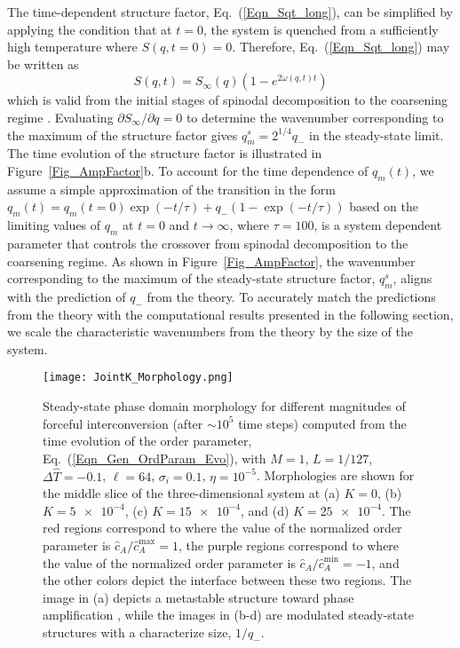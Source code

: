 \documentclass[5p,twocolumn]{elsarticle}
\begin{document}
The time-dependent structure factor, Eq.~(\ref{Eqn_Sqt_long}), can be simplified by applying the condition that at $t=0$, the system is quenched from a sufficiently high temperature where $S(q,t=0)=0$. Therefore, Eq.~(\ref{Eqn_Sqt_long}) may be written as
\begin{equation}\label{Eqn-SCH}
	S(q,t) = S_{\infty}(q)\left(1 - e^{2\omega(q,t)t}\right) 
\end{equation}
which is valid from the initial stages of spinodal decomposition to the coarsening regime \cite{binder_collective_1983,Cahn_Later_1966}. Evaluating $\partial S_\infty/\partial q =0$ to determine the wavenumber corresponding to the maximum of the structure factor gives $q_m^s = 2^{1/4}q_-$ in the steady-state limit. The time evolution of the structure factor is illustrated in Figure~\ref{Fig_AmpFactor}b. To account for the time dependence of $q_m(t)$, we assume a simple approximation of the transition in the form $q_m(t)=q_m(t=0)\exp(-t/\tau)+q_-(1-\exp(-t/\tau))$ based on the limiting values of $q_m$ at $t=0$ and $t\to\infty$, where $\tau = 100$, is a system dependent parameter that controls the crossover from spinodal decomposition to the coarsening regime. As shown in Figure~\ref{Fig_AmpFactor}, the wavenumber corresponding to the maximum of the steady-state structure factor, $q_m^s$, aligns with the prediction of $q_-$ from the theory. To accurately match the predictions from the theory with the computational results presented in the following section, we scale the characteristic wavenumbers from the theory by the size of the system.

\begin{figure}[t]
    \centering
    \texttt{[image: JointK\_Morphology.png]}
    \caption{Steady-state phase domain morphology for different magnitudes of forceful interconversion (after $\sim 10^5$ time steps) computed from the time evolution of the order parameter, Eq.~(\ref{Eqn_Gen_OrdParam_Evo}), with $M=1$, $L=1/127$, $\Delta \hat{T} = -0.1$, $\ell=64$, $\sigma_i =0.1$, $\eta = 10^{-5}$. Morphologies are shown for the middle slice of the three-dimensional system at (a) $K=0$, (b) $K=\num{5e-4}$, (c) $K=\num{15e-4}$, and (d) $K=\num{25e-4}$. The red regions correspond to where the value of the normalized order parameter is $\hat{c}_A/\hat{c}_A^\text{max}=1$, the purple regions correspond to where the value of the normalized order parameter is $\hat{c}_A/\hat{c}_A^\text{min}=-1$, and the other colors depict the interface between these two regions. The image in (a) depicts a metastable structure toward phase amplification \cite{Shum_Phase_2021}, while the images in (b-d) are modulated steady-state structures with a characterize size, $1/q_-$.}
    \label{Fig_Morphology}
\end{figure}
\end{document}
